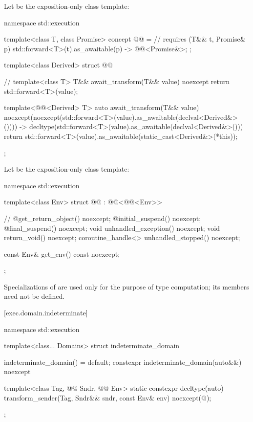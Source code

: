 \pnum
Let  be the exposition-only class template:
\begin{codeblock}
namespace std::execution {
  template<class T, class Promise>
    concept @@ =                                  // \expos
      requires (T&& t, Promise& p) {
        { std::forward<T>(t).as_awaitable(p) } -> @@<Promise&>;
      };

  template<class Derived>
    struct @@ {                               // \expos
      template<class T>
        T&& await_transform(T&& value) noexcept {
          return std::forward<T>(value);
        }

      template<@@<Derived> T>
        auto await_transform(T&& value)
          noexcept(noexcept(std::forward<T>(value).as_awaitable(declval<Derived&>())))
          -> decltype(std::forward<T>(value).as_awaitable(declval<Derived&>())) {
          return std::forward<T>(value).as_awaitable(static_cast<Derived&>(*this));
        }
    };
}
\end{codeblock}

\pnum
Let  be the exposition-only class template:
\begin{codeblock}
namespace std::execution {
  template<class Env>
  struct @@ : @@<@@<Env>> { // \expos
    @\unspec@ get_return_object() noexcept;
    @\unspec@ initial_suspend() noexcept;
    @\unspec@ final_suspend() noexcept;
    void unhandled_exception() noexcept;
    void return_void() noexcept;
    coroutine_handle<> unhandled_stopped() noexcept;

    const Env& get_env() const noexcept;
  };
}
\end{codeblock}
\begin{note}
Specializations of  are used only for the purpose of type computation;
its members need not be defined.
\end{note}

[exec.domain.indeterminate]{}

\pnum
{}%
%
\begin{codeblock}
namespace std::execution {
  template<class... Domains>
  struct indeterminate_domain {
    indeterminate_domain() = default;
    constexpr indeterminate_domain(auto&&) noexcept {}

    template<class Tag, @@ Sndr, @@ Env>
      static constexpr decltype(auto) transform_sender(Tag, Sndr&& sndr, const Env& env)
        noexcept(@\seebelow@);
  };
}
\end{codeblock}

